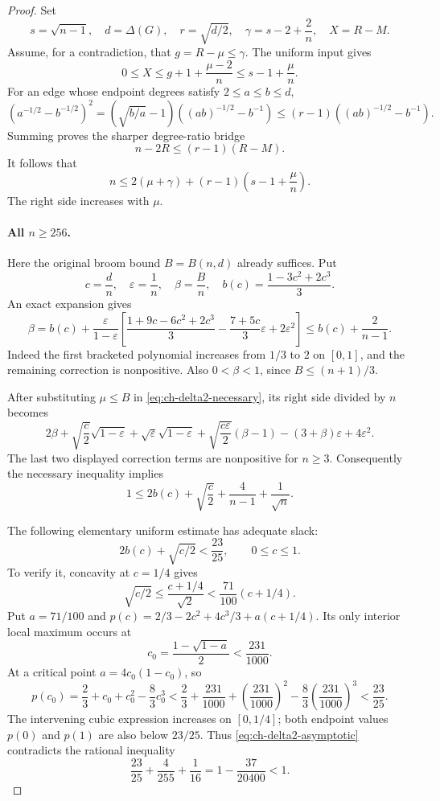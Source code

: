 \documentclass[11pt,a4paper]{article}
\theoremstyle{remark}
\numberwithin{equation}{section}
\begin{document}
\begin{proof}
Set
\[
 s=\sqrt{n-1},\quad d=\Delta(G),\quad r=\sqrt{d/2},
 \quad\gamma=s-2+\frac2n,\quad X=R-M.
\]
Assume, for a contradiction, that \(g=R-\mu\le\gamma\).
The uniform input gives
\[
 0\le X\le g+1+\frac{\mu-2}{n}
       \le s-1+\frac\mu n.
\]
For an edge whose endpoint degrees satisfy \(2\le a\le b\le d\),
\[
 (a^{-1/2}-b^{-1/2})^2
 =(\sqrt{b/a}-1)((ab)^{-1/2}-b^{-1})
 \le(r-1)((ab)^{-1/2}-b^{-1}).
\]
Summing proves the sharper degree-ratio bridge
\[
 n-2R\le(r-1)(R-M).
\]
It follows that
\begin{equation}\label{eq:ch-delta2-necessary}
 n\le 2(\mu+\gamma)+(r-1)\left(s-1+\frac\mu n\right).
\end{equation}
The right side increases with \(\mu\).

\paragraph{All \(n\ge256\).}
Here the original broom bound \(B=B(n,d)\) already suffices. Put
\[
 c=\frac dn,\quad \varepsilon=\frac1n,\quad \beta=\frac Bn,
 \quad b(c)=\frac{1-3c^2+2c^3}{3}.
\]
An exact expansion gives
\[
 \beta=b(c)+\frac{\varepsilon}{1-\varepsilon}
 \left[
  \frac{1+9c-6c^2+2c^3}{3}
  -\frac{7+5c}{3}\varepsilon+2\varepsilon^2
 \right]
 \le b(c)+\frac2{n-1}.
\]
Indeed the first bracketed polynomial increases from \(1/3\) to \(2\)
on \([0,1]\), and the remaining correction is nonpositive.
Also \(0<\beta<1\), since \(B\le(n+1)/3\).

After substituting \(\mu\le B\) in
\eqref{eq:ch-delta2-necessary}, its right side divided by \(n\) becomes
\[
 2\beta+\sqrt{\frac c2}\sqrt{1-\varepsilon}
 +\sqrt\varepsilon\sqrt{1-\varepsilon}
 +\sqrt{\frac{c\varepsilon}{2}}(\beta-1)
 -(3+\beta)\varepsilon+4\varepsilon^2.
\]
The last two displayed correction terms are nonpositive for \(n\ge3\).
Consequently the necessary inequality implies
\begin{equation}\label{eq:ch-delta2-asymptotic}
 1\le2b(c)+\sqrt{\frac c2}+\frac4{n-1}+\frac1{\sqrt n}.
\end{equation}

The following elementary uniform estimate has adequate slack:
\[
 2b(c)+\sqrt{c/2}<\frac{23}{25},
 \qquad 0\le c\le1.
\]
To verify it, concavity at \(c=1/4\) gives
\[
 \sqrt{c/2}\le\frac{c+1/4}{\sqrt2}
 <\frac{71}{100}(c+1/4).
\]
Put \(a=71/100\) and
\(p(c)=2/3-2c^2+4c^3/3+a(c+1/4)\).
Its only interior local maximum occurs at
\[
 c_0=\frac{1-\sqrt{1-a}}2<\frac{231}{1000}.
\]
At a critical point \(a=4c_0(1-c_0)\), so
\[
 p(c_0)=\frac23+c_0+c_0^2-\frac83c_0^3
 <\frac23+\frac{231}{1000}
   +\left(\frac{231}{1000}\right)^2
   -\frac83\left(\frac{231}{1000}\right)^3
 <\frac{23}{25}.
\]
The intervening cubic expression increases on \([0,1/4]\); both
endpoint values \(p(0)\) and \(p(1)\) are also below \(23/25\).
Thus \eqref{eq:ch-delta2-asymptotic} contradicts the rational inequality
\[
 \frac{23}{25}+\frac4{255}+\frac1{16}
 =1-\frac{37}{20400}<1.
\]


\end{proof}
\end{document}
